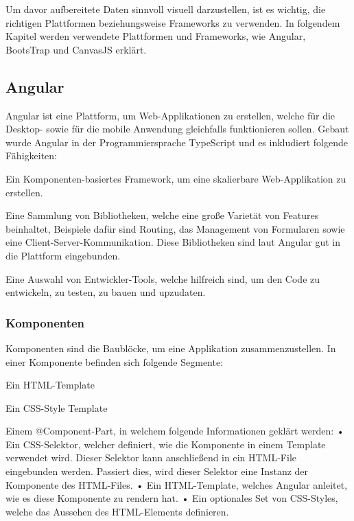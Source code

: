Um davor aufbereitete Daten sinnvoll visuell darzustellen, ist es wichtig, die richtigen Plattformen beziehungsweise Frameworks zu verwenden. In folgendem Kapitel werden verwendete Plattformen und Frameworks, wie Angular, BootsTrap und CanvasJS erklärt. 
\subsection{Angular}
 
Angular ist eine Plattform, um Web-Applikationen zu erstellen, welche für die Desktop- sowie für die mobile Anwendung gleichfalls funktionieren sollen. Gebaut wurde Angular in der Programmiersprache TypeScript und es inkludiert folgende Fähigkeiten:
 
\begin{compactitem}
    \item Ein Komponenten-basiertes Framework, um eine skalierbare Web-Applikation zu erstellen.
    \item Eine Sammlung von Bibliotheken, welche eine große Varietät von Features beinhaltet, Beispiele dafür sind Routing, das Management von Formularen sowie eine Client-Server-Kommunikation. Diese Bibliotheken sind laut Angular gut in die Plattform eingebunden.
    \item Eine Auswahl von Entwickler-Tools, welche hilfreich sind, um den Code zu entwickeln, zu testen, zu bauen und upzudaten.
\end{compactitem}
 
\subsubsection{Komponenten}
Komponenten sind die Baublöcke, um eine Applikation zusammenzustellen. In einer Komponente befinden sich folgende Segmente:
 
\begin{compactitem}
    \item Ein HTML-Template
    \item Ein CSS-Style Template
    \item Einem @Component-Part, in welchem folgende Informationen geklärt werden:
    \subitem • Ein CSS-Selektor, welcher definiert, wie die Komponente in einem Template verwendet wird. Dieser Selektor kann anschließend in ein HTML-File eingebunden werden. Passiert dies, wird dieser Selektor eine Instanz der Komponente des HTML-Files.
    \subitem • Ein HTML-Template, welches Angular anleitet, wie es diese Komponente zu rendern hat.
    \subitem • Ein optionales Set von CSS-Styles, welche das Aussehen des HTML-Elements definieren.
\end{compactitem}
\cite{angularOfficialSite}
 
